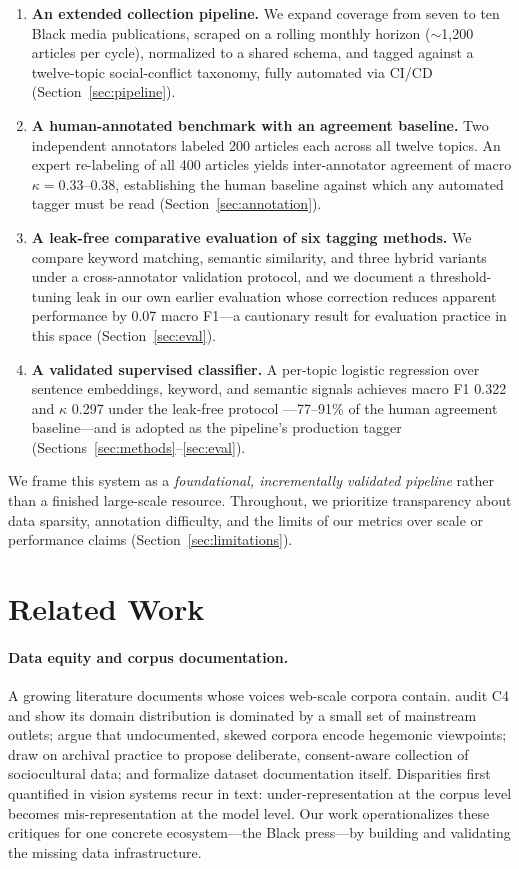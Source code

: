 \documentclass[letterpaper,twocolumn,10pt]{article}
\begin{document}
\begin{enumerate}
\item \textbf{An extended collection pipeline.} We expand coverage from
seven to ten Black media publications, scraped on a rolling monthly
horizon ($\sim$1{,}200 articles per cycle), normalized to a shared schema,
and tagged against a twelve-topic social-conflict taxonomy, fully
automated via CI/CD (Section~\ref{sec:pipeline}).
\item \textbf{A human-annotated benchmark with an agreement baseline.} Two
independent annotators labeled 200 articles each across all twelve topics.
An expert re-labeling of all 400 articles yields inter-annotator agreement
of macro $\kappa = 0.33$--$0.38$, establishing the human baseline
against which any automated tagger must be read
(Section~\ref{sec:annotation}).
\item \textbf{A leak-free comparative evaluation of six tagging methods.}
We compare keyword matching, semantic similarity, and three hybrid
variants under a cross-annotator validation protocol, and we document a
threshold-tuning leak in our own earlier evaluation whose correction
reduces apparent performance by 0.07 macro F1---a cautionary result for
evaluation practice in this space (Section~\ref{sec:eval}).
\item \textbf{A validated supervised classifier.} A per-topic logistic
regression over sentence embeddings, keyword, and semantic signals
achieves macro F1 0.322 and $\kappa$ 0.297 under the leak-free protocol
---77--91\% of the human agreement baseline---and is adopted as the
pipeline's production tagger (Sections~\ref{sec:methods}--\ref{sec:eval}).
\end{enumerate}

We frame this system as a \emph{foundational, incrementally validated
pipeline} rather than a finished large-scale resource. Throughout, we
prioritize transparency about data sparsity, annotation difficulty, and
the limits of our metrics over scale or performance claims
(Section~\ref{sec:limitations}).

\section{Related Work}

\paragraph{Data equity and corpus documentation.}
A growing literature documents whose voices web-scale corpora contain.
\citet{dodge2021} audit C4 and show its domain distribution is dominated
by a small set of mainstream outlets; \citet{bender2021} argue that
undocumented, skewed corpora encode hegemonic viewpoints;
\citet{jo2020} draw on archival practice to propose deliberate,
consent-aware collection of sociocultural data; and \citet{gebru2021}
formalize dataset documentation itself. Disparities first quantified in
vision systems \cite{buolamwini2018} recur in text: under-representation
at the corpus level becomes mis-representation at the model level. Our
work operationalizes these critiques for one concrete ecosystem---the
Black press---by building and validating the missing data infrastructure.
\end{document}
